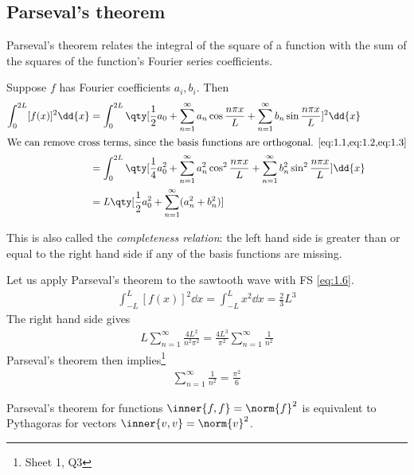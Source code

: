 \subsection{Parseval's theorem}
Parseval's theorem relates the integral of the square of a function with the sum of the squares of the function's Fourier series coefficients.
\begin{theorem}
    Suppose $f$ has Fourier coefficients $a_i, b_i$.
    Then
    \begin{align}
        \int_0^{2L} [f(x)]^2 \dd{x} & = \int_0^{2L} \qty[ \frac{1}{2}a_0 + \sum_{n=1}^\infty a_n \cos \frac{n \pi x}{L} + \sum_{n=1}^\infty b_n \sin \frac{n\pi x}{L} ]^2 \dd{x} \notag \\
        \intertext{We can remove cross terms, since the basis functions are orthogonal. \cref{eq:1.1,eq:1.2,eq:1.3}}
        & = \int_0^{2L} \qty[ \frac{1}{4} a_0^2 + \sum_{n=1}^\infty a_n^2 \cos^2 \frac{n\pi x}{L} + \sum_{n=1}^\infty b_n^2 \sin^2 \frac{n\pi x}{L} ] \dd{x} \notag \\
        & = L \qty[ \frac{1}{2} a_0^2 + \sum_{n=1}^\infty (a_n^2 + b_n^2) ] \label{eq:1.10}
    \end{align}
\end{theorem}
\noindent This is also called the \textit{completeness relation}: the left hand side is greater than or equal to the right hand side if any of the basis functions are missing.
\begin{example}
    Let us apply Parseval's theorem to the sawtooth wave with FS \cref{eq:1.6}.
    \begin{align*}
        \int_{-L}^L [f(x)]^2 \dd{x} = \int_{-L}^L x^2 \dd{x} = \frac{2}{3}L^3
    \end{align*}
    The right hand side gives
    \begin{align*}
        L \sum_{n=1}^\infty \frac{4L^2}{n^2 \pi^2} = \frac{4 L^3}{\pi^2} \sum_{n=1}^\infty \frac{1}{n^2}
    \end{align*}
    Parseval's theorem then implies\footnote{Sheet 1, Q3}
    \begin{align*}
        \sum_{n=1}^\infty \frac{1}{n^2} = \frac{\pi^2}{6}
    \end{align*}
\end{example}
\begin{note}
    Parseval's theorem for functions $\inner{f, f} = \norm{f}^2$ is equivalent to Pythagoras for vectors $\inner{v, v} = \norm{v}^2$.
\end{note} 

